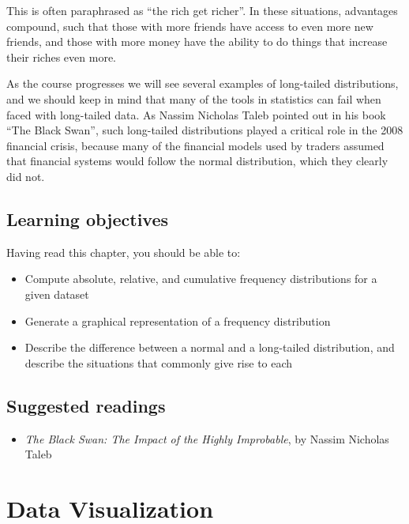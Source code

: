 \documentclass[12pt,]{book}
\providecommand{\tightlist}{%
  \setlength{\itemsep}{0pt}\setlength{\parskip}{0pt}}
\theoremstyle{definition}
\theoremstyle{definition}
\theoremstyle{definition}
\theoremstyle{remark}
\begin{document}
This is often paraphrased as ``the rich get richer''. In these situations, advantages compound, such that those with more friends have access to even more new friends, and those with more money have the ability to do things that increase their riches even more.

As the course progresses we will see several examples of long-tailed distributions, and we should keep in mind that many of the tools in statistics can fail when faced with long-tailed data. As Nassim Nicholas Taleb pointed out in his book ``The Black Swan'', such long-tailed distributions played a critical role in the 2008 financial crisis, because many of the financial models used by traders assumed that financial systems would follow the normal distribution, which they clearly did not.

\hypertarget{learning-objectives-2}{%
\section{Learning objectives}\label{learning-objectives-2}}

Having read this chapter, you should be able to:

\begin{itemize}
\tightlist
\item
  Compute absolute, relative, and cumulative frequency distributions for a given dataset
\item
  Generate a graphical representation of a frequency distribution
\item
  Describe the difference between a normal and a long-tailed distribution, and describe the situations that commonly give rise to each
\end{itemize}

\hypertarget{suggested-readings-2}{%
\section{Suggested readings}\label{suggested-readings-2}}

\begin{itemize}
\tightlist
\item
  \emph{The Black Swan: The Impact of the Highly Improbable}, by Nassim Nicholas Taleb
\end{itemize}

\hypertarget{data-visualization}{%
\chapter{Data Visualization}\label{data-visualization}}
\end{document}
